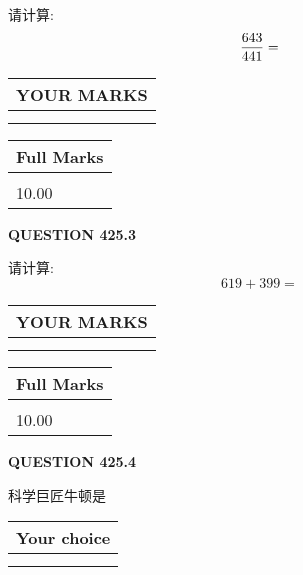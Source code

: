 \documentclass{ctexart}
\begin{document}
  
 
请计算:
\begin{equation}
\frac { %
643 }  {  %
441} = \nonumber
\end{equation}
 

 

 
  
\vspace{0.2in}
  
\noindent\begin{tabular}{|l|}
\hline
 YOUR MARKS  \\
\hline
 \\ 
 \\ 
\hline
\end{tabular}
\hspace{0.05in} \begin{tabular}{|l|}
\hline
 Full Marks  \\
\hline
 \\ 
10.00 \\
\hline
\end{tabular}
{\textbf{\Large{QUESTION
425.3 
}}}
  
  
 
请计算:
\begin{equation}
619 +  %
399 = \nonumber
\end{equation}
 

 

 
  
\vspace{0.2in}
  
\noindent\begin{tabular}{|l|}
\hline
 YOUR MARKS  \\
\hline
 \\ 
 \\ 
\hline
\end{tabular}
\hspace{0.05in} \begin{tabular}{|l|}
\hline
 Full Marks  \\
\hline
 \\ 
10.00 \\
\hline
\end{tabular}
{\textbf{\Large{QUESTION
425.4 
}}}
  
  
科学巨匠牛顿是
  
  
\noindent\hspace{3.0in} \begin{tabular}{|l|}
\hline
Your choice \\
\hline
 \\ 
 \\ 
\hline
\end{tabular}
  
\end{document}
